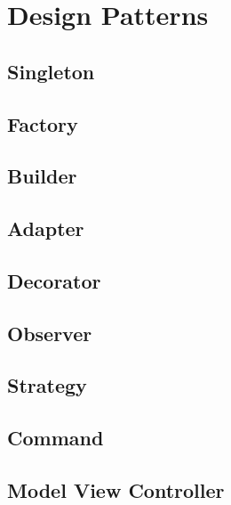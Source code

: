 \documentclass[../main.tex]{subfiles}
\begin{document}
	
	\section{Design Patterns}
	
	\subsection{Singleton}
	\clearpage
	
	\subsection{Factory}
	\clearpage
	
	\subsection{Builder}
	\clearpage
	
	\subsection{Adapter}
	\clearpage
	
	\subsection{Decorator}
	\clearpage	
	
	\subsection{Observer}
	\clearpage
	
	\subsection{Strategy}
	\clearpage
	
	\subsection{Command}
	\clearpage
	
	\subsection{Model View Controller}
	\clearpage
\end{document}
